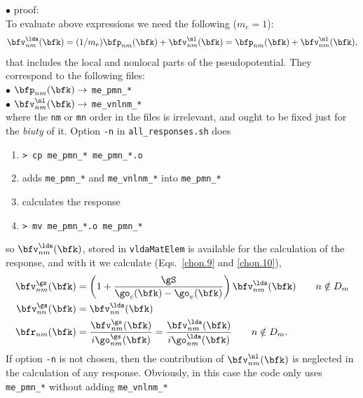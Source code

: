 $\bullet$ proof:\\
To evaluate above expressions we need the following ($m_e=1$):
\begin{align}\label{}
\bfv^\lda_{nm}(\bfk) 
=(1/m_e)\bfp_{nm}(\bfk)+\bfv^\nl_{nm}(\bfk)
=\bfp_{nm}(\bfk)+\bfv^\nl_{nm}(\bfk)
,
\end{align}
that
 includes the local and nonlocal parts of the pseudopotential. They
 correspond to the following files:\\
$\bullet$ $\bfp_{nm}(\bfk)\to$ \verb=me_pmn_*=\\
$\bullet$ $\bfv^\nl_{nm}(\bfk)\to$ \verb=me_vnlnm_*=\\
where the \verb=nm= or \verb=mn= order in the files is irrelevant, and
ought to be fixed just for the {\it biuty} of it.
Option \verb=-n= in \verb=all_responses.sh= does
\begin{enumerate}
\item 
 \verb=> cp me_pmn_* me_pmn_*.o= 
\item adds \verb=me_pmn_*= and \verb=me_vnlnm_*= into
  \verb=me_pmn_*= 
\item calculates the response
\item \verb=> mv me_pmn_*.o me_pmn_*=
\end{enumerate}
so   
$\bfv^\lda_{nm}(\bfk)$, stored in \verb=vldaMatElem=
is available for the calculation of the response, and with it we calculate
(Eqs.~\eqref{chon.9} and \eqref{chon.10}),
\begin{align}\label{c-chon.98}
\bfv^\gs_{nm}(\bfk)
&=
\left(1+\frac{\gS}{\go_c(\bfk)-\go_v(\bfk)}\right)\bfv^\lda_{nm}(\bfk)
\quad\quad n\notin D_m
\nonumber\\
\bfv^\gs_{nn}(\bfk)
&=
\bfv^\lda_{nn}(\bfk)
\nonumber\\
\bfr_{nm}(\bfk)&=\frac{\bfv^\gs_{nm}(\bfk)}{i\go^\gs_{nm}(\bfk)}
=\frac{\bfv^\lda_{nm}(\bfk)}{i\go^\lda_{nm}(\bfk)}
\quad\quad n\notin D_m
.
\end{align}   
If option \verb=-n= is not chosen, then the contribution of $\bfv^\nl_{nm}(\bfk)$
is neglected in the calculation of any response. Obviously, in this
case the code only uses \verb=me_pmn_*= without adding \verb=me_vnlnm_*= 


